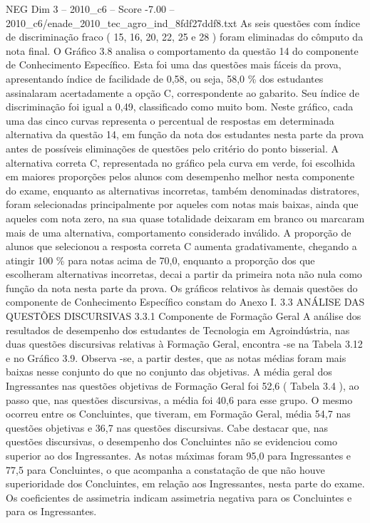 \begin{textsample}{NEG Dim 3 – 2010\_c6 – Score -7.00 – 2010\_c6/enade\_2010\_tec\_agro\_ind\_8fdf27ddf8.txt}
As seis questões com índice de discriminação fraco ( 15, 16, 20, 22, 25 e 28 ) foram eliminadas do cômputo da nota final.
O Gráfico 3.8 analisa o comportamento da questão 14 do componente de Conhecimento Específico.
Esta foi uma das questões mais fáceis da prova, apresentando índice de facilidade de 0,58, ou seja, 58,0 \% dos estudantes assinalaram acertadamente a opção C, correspondente ao gabarito.
Seu índice de discriminação foi igual a 0,49, classificado como muito bom.
Neste gráfico, cada uma das cinco curvas representa o percentual de respostas em determinada alternativa da questão 14, em função da nota dos estudantes nesta parte da prova antes de possíveis eliminações de questões pelo critério do ponto bisserial.
A alternativa correta C, representada no gráfico pela curva em verde, foi escolhida em maiores proporções pelos alunos com desempenho melhor nesta componente do exame, enquanto as alternativas incorretas, também denominadas distratores, foram selecionadas principalmente por aqueles com notas mais baixas, ainda que aqueles com nota zero, na sua quase totalidade deixaram em branco ou marcaram mais de uma alternativa, comportamento considerado inválido.
A proporção de alunos que selecionou a resposta correta C aumenta gradativamente, chegando a atingir 100 \% para notas acima de 70,0, enquanto a proporção dos que escolheram alternativas incorretas, decai a partir da primeira nota não nula como função da nota nesta parte da prova.
Os gráficos relativos às demais questões do componente de Conhecimento Específico constam do Anexo I. 3.3 ANÁLISE DAS QUESTÕES DISCURSIVAS 3.3.1 Componente de Formação Geral A análise dos resultados de desempenho dos estudantes de Tecnologia em Agroindústria, nas duas questões discursivas relativas à Formação Geral, encontra -se na Tabela 3.12 e no Gráfico 3.9.
Observa -se, a partir destes, que as notas médias foram mais baixas nesse conjunto do que no conjunto das objetivas.
A média geral dos Ingressantes nas questões objetivas de Formação Geral foi 52,6 ( Tabela 3.4 ), ao passo que, nas questões discursivas, a média foi 40,6 para esse grupo.
O mesmo ocorreu entre os Concluintes, que tiveram, em Formação Geral, média 54,7 nas questões objetivas e 36,7 nas questões discursivas.
Cabe destacar que, nas questões discursivas, o desempenho dos Concluintes não se evidenciou como superior ao dos Ingressantes.
As notas máximas foram 95,0 para Ingressantes e 77,5 para Concluintes, o que acompanha a constatação de que não houve superioridade dos Concluintes, em relação aos Ingressantes, nesta parte do exame.
Os coeficientes de assimetria indicam assimetria negativa para os Concluintes e para os Ingressantes.

\end{textsample}

